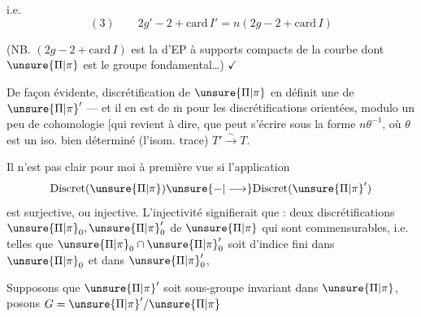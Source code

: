 i.e.
\[
(3)\qquad 2g'-2+\mathrm{card}\,I'=n(2g-2+\mathrm{card}\,I)
\]

(NB.  \((2g-2+\mathrm{card}\,I)\) est
 la  d'EP à supports
compacts de la courbe dont \(\unsure{\Pi|\pi}\) est le groupe
fondamental\ldots) \(\checkmark\)


De façon évidente,  discrétification de \(\unsure{\Pi|\pi}\)
en définit une de \(\unsure{\Pi|\pi}'\) --- et il en est de
\(\overline{\mathrm m}\) pour les discrétifications orientées, modulo
un peu de cohomologie [qui revient à dire,
que
peut s'écrire sous la forme \(n\theta^{-1}\), où \(\theta\) est un iso. bien
déterminé (l'isom. trace)  \(T'\xrightarrow{\sim}T\).

Il n'est pas clair pour moi à première
vue si l'application
\[
\mathrm{Discret}(\unsure{\Pi|\pi})\unsure{-|\longrightarrow}\mathrm{Discret}(\unsure{\Pi|\pi}')
\]
est surjective, ou injective. L'injectivité
signifierait que : deux discrétifications \(\unsure{\Pi|\pi}_0,\unsure{\Pi|\pi}'_0\) de
\(\unsure{\Pi|\pi}\) qui sont commensurables, i.e. telles que
\(\unsure{\Pi|\pi}_0\cap\unsure{\Pi|\pi}'_0\) soit d'indice fini dans \(\unsure{\Pi|\pi}_0\) et dans \(\unsure{\Pi|\pi}'_0\),

Supposons que \(\unsure{\Pi|\pi}'\) soit sous-groupe invariant
dans \(\unsure{\Pi|\pi}\), posons \(G=\unsure{\Pi|\pi}'/\unsure{\Pi|\pi}\)

